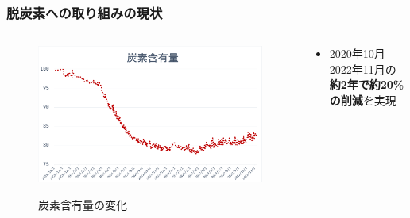 \begin{frame}
  \frametitle{脱炭素への取り組みの現状}

  \pause
  \begin{columns}
    \begin{column}{0.6\textwidth}
      \begin{figure}[h]
        \centering
        \includegraphics[width=1\textwidth]{img/bodymass.pdf}
        \label{fig:bodymass}
        \caption{炭素含有量の変化}
      \end{figure}
    \end{column}
    \begin{column}{0.4\textwidth}
      \pause
      \begin{itemize}
        \item 2020年10月---2022年11月の\textbf{約2年で約20\%の削減}を実現
      \end{itemize}

      \pause
    \end{column}
  \end{columns}
\end{frame}

